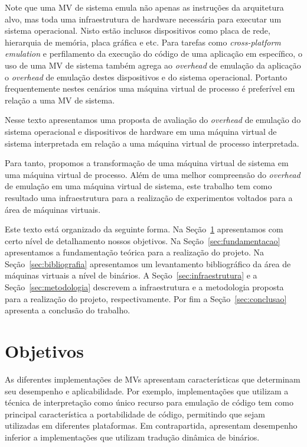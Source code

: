 \documentclass[11pt,twoside]{article}
\begin{document}
Note que uma MV de sistema emula não apenas as instruções da arquitetura alvo, mas toda uma infraestrutura de hardware
necessária para executar um sistema operacional. Nisto estão inclusos dispositivos como placa de rede, hierarquia de memória,
placa gráfica e etc. Para tarefas como \textit{cross-platform emulation} e perfilamento da execução do código de uma aplicação
em específico, o uso de uma MV de sistema também agrega ao \textit{overhead} de emulação da aplicação o \textit{overhead} de emulação destes 
dispositivos e do sistema operacional. Portanto frequentemente nestes cenários uma máquina virtual de processo é preferível
em relação a uma MV de sistema.

Nesse texto apresentamos uma proposta de avaliação do \textit{overhead} de emulação do sistema operacional e dispositivos de hardware em uma máquina virtual de sistema interpretada em relação a uma máquina virtual de processo interpretada. 

Para tanto, propomos a transformação de uma máquina virtual de sistema em uma máquina virtual de processo. 
Além de uma melhor compreensão do \textit{overhead} de emulação em uma máquina virtual de sistema, este trabalho tem como resultado uma infraestrutura para a realização de experimentos voltados para a área de máquinas virtuais. 

Este texto está organizado da seguinte forma. Na Seção~\ref{sec:objetivos} apresentamos com certo nível de detalhamento nossos objetivos. 
Na Seção~\ref{sec:fundamentacao} apresentamos a fundamentação teórica para a realização do projeto. Na Seção~\ref{sec:bibliografia} apresentamos um levantamento bibliográfico da área de máquinas virtuais a nível de binários. 
A Seção~\ref{sec:infraestrutura} e a Seção~\ref{sec:metodologia} descrevem a infraestrutura e a metodologia proposta para a realização do projeto, respectivamente. 
Por fim a Seção~\ref{sec:conclusao} apresenta a conclusão do trabalho. 
  
  
\section{Objetivos} \label{sec:objetivos}
As diferentes implementações de MVs apresentam características que determinam seu desempenho e aplicabilidade.
Por exemplo, implementações que utilizam a técnica de interpretação como único recurso para emulação de código tem como principal característica a portabilidade de código, permitindo que sejam utilizadas em diferentes plataformas. 
Em contrapartida, apresentam desempenho inferior a implementações que utilizam tradução dinâmica de binários.
\end{document}
